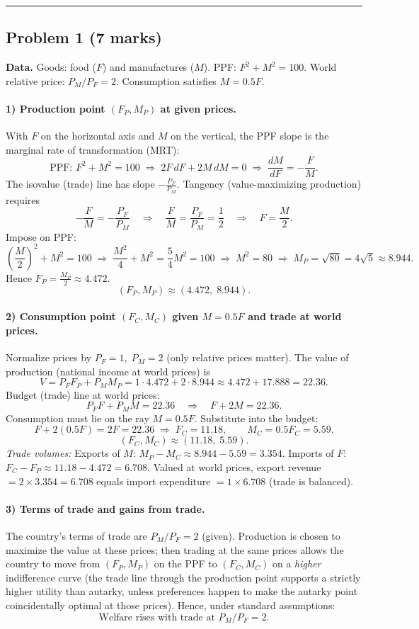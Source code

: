 \documentclass[12pt]{article}
\begin{document}
\hrule
\vspace{1em}
\newpage

\subsection*{Problem 1 (7 marks)}
\textbf{Data.} Goods: food ($F$) and manufactures ($M$). PPF: $F^2 + M^2 = 100$. World relative price: $P_M/P_F = 2$. Consumption satisfies $M = 0.5F$.

\paragraph{1) Production point $(F_P,M_P)$ at given prices.}
With $F$ on the horizontal axis and $M$ on the vertical, the PPF slope is the marginal rate of transformation (MRT):
\[
\text{PPF: } F^2 + M^2 = 100 \;\Rightarrow\; 2F\,dF + 2M\,dM = 0 \;\Rightarrow\; \frac{dM}{dF} = -\frac{F}{M}.
\]
The isovalue (trade) line has slope $-\frac{P_F}{P_M}$. Tangency (value-maximizing production) requires
\[
-\frac{F}{M} = -\frac{P_F}{P_M} \quad \Rightarrow \quad \frac{F}{M} = \frac{P_F}{P_M} = \frac{1}{2}\quad\Rightarrow\quad F=\frac{M}{2}.
\]
Impose on PPF:
\[
\left(\frac{M}{2}\right)^2 + M^2 = 100 \;\Rightarrow\; \frac{M^2}{4}+M^2 = \frac{5}{4}M^2=100 \;\Rightarrow\; M^2=80 \;\Rightarrow\; M_P=\sqrt{80}=4\sqrt{5}\approx 8.944.
\]
Hence $F_P=\frac{M_P}{2}\approx 4.472$.
\[
\boxed{(F_P,M_P) \approx (4.472,\;8.944)}.
\]

\paragraph{2) Consumption point $(F_C,M_C)$ given $M=0.5F$ and trade at world prices.}
Normalize prices by $P_F=1,\;P_M=2$ (only relative prices matter). The value of production (national income at world prices) is
\[
V = P_F F_P + P_M M_P = 1\cdot 4.472 + 2\cdot 8.944 \approx 4.472 + 17.888 = 22.36.
\]
Budget (trade) line at world prices:
\[
P_F F + P_M M = 22.36 \quad \Rightarrow \quad F + 2M = 22.36.
\]
Consumption must lie on the ray $M=0.5F$. Substitute into the budget:
\[
F + 2(0.5F) = 2F = 22.36 \;\Rightarrow\; F_C = 11.18,\qquad M_C = 0.5F_C = 5.59.
\]
\[
\boxed{(F_C,M_C) \approx (11.18,\;5.59)}.
\]
\textit{Trade volumes:} Exports of $M$: $M_P - M_C \approx 8.944-5.59 = 3.354$. Imports of $F$: $F_C - F_P \approx 11.18-4.472 = 6.708$. Valued at world prices, export revenue $=2\times 3.354=6.708$ equals import expenditure $=1\times 6.708$ (trade is balanced).

\paragraph{3) Terms of trade and gains from trade.}
The country’s terms of trade are $P_M/P_F = 2$ (given). Production is chosen to maximize the value at these prices; then trading at the same prices allows the country to move from $(F_P,M_P)$ on the PPF to $(F_C,M_C)$ on a \emph{higher} indifference curve (the trade line through the production point supports a strictly higher utility than autarky, unless preferences happen to make the autarky point coincidentally optimal at those prices). Hence, under standard assumptions:
\[
\boxed{\text{Welfare rises with trade at } P_M/P_F=2.}
\]
\end{document}
